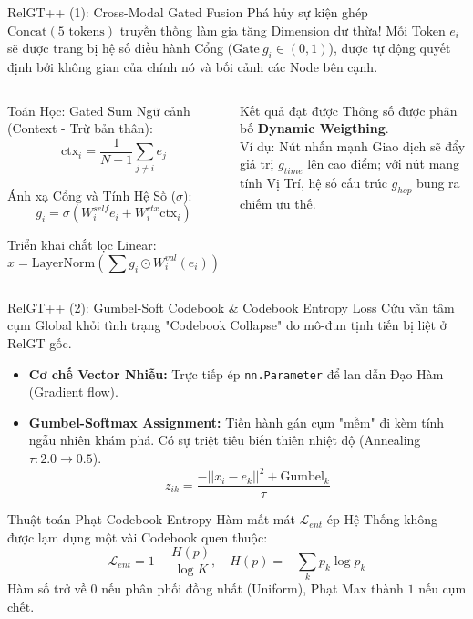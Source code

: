 \documentclass[aspectratio=169,11pt]{beamer}
\begin{document}
\begin{frame}{RelGT++ (1): Cross-Modal Gated Fusion}
Phá hủy sự kiện ghép $\text{Concat}(5 \text{ tokens})$ truyền thống làm gia tăng Dimension dư thừa!
Mỗi Token $e_i$ sẽ được trang bị hệ số điều hành Cổng ($\text{Gate}\ g_i \in (0, 1)$), được tự động quyết định bởi không gian của chính nó và bối cảnh các Node bên cạnh.

\begin{columns}[T]
\begin{block}{Toán Học: Gated Sum}
Ngữ cảnh (Context - Trừ bản thân):
$$ \text{ctx}_i = \frac{1}{N-1}\sum_{j \neq i} e_j $$

Ánh xạ Cổng và Tính Hệ Số ($\sigma$):
$$ g_i = \sigma(W_{i}^{self} e_i + W_{i}^{ctx} \text{ctx}_i) $$

Triển khai chắt lọc Linear:
$$ x = \text{LayerNorm}\left(\sum g_i \odot W_{i}^{val} (e_i)\right) $$
\end{block}

\begin{exampleblock}{Kết quả đạt được}
Thông số được phân bố \textbf{Dynamic Weigthing}. \\ 
\vspace{5pt}
Ví dụ: Nút nhấn mạnh Giao dịch sẽ đẩy giá trị $g_{time}$ lên cao điểm; với nút mang tính Vị Trí, hệ số cấu trúc $g_{hop}$ bung ra chiếm ưu thế.
\end{exampleblock}
\end{columns}
\end{frame}

\begin{frame}{RelGT++ (2): Gumbel-Soft Codebook \& Codebook Entropy Loss}
Cứu vãn tâm cụm Global khỏi tình trạng "Codebook Collapse" do mô-đun tịnh tiến bị liệt ở RelGT gốc. 

\begin{itemize}
    \item \textbf{Cơ chế Vector Nhiễu:} Trực tiếp ép \texttt{nn.Parameter} để lan dẫn Đạo Hàm (Gradient flow). 
    \item \textbf{Gumbel-Softmax Assignment:} Tiến hành gán cụm "mềm" đi kèm tính ngẫu nhiên khám phá. Có sự triệt tiêu biến thiên nhiệt độ (Annealing $\tau: 2.0 \to 0.5$).
    $$ z_{ik} = \frac{-||x_i - e_k||^2 + \text{Gumbel}_k}{\tau} $$
\end{itemize}

\begin{alertblock}{Thuật toán Phạt Codebook Entropy}
Hàm mất mát $\mathcal{L}_{ent}$ ép Hệ Thống không được lạm dụng một vài Codebook quen thuộc:
$$ \mathcal{L}_{ent} = 1 - \frac{H(p)}{\log K}, \quad H(p) = -\sum_k p_k \log p_k $$
Hàm số trở về $0$ nếu phân phối đồng nhất (Uniform), Phạt Max thành $1$ nếu cụm chết.
\end{alertblock}
\end{frame}
\end{document}
